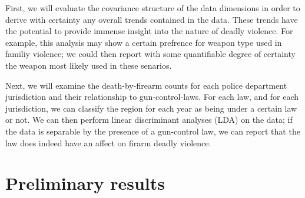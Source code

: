 
First, we will evaluate the covariance structure of the data dimensions in order to derive with certainty any overall trends contained in the data.  These trends have the potential to provide immense insight into the nature of deadly violence.  For example, this analysis may show a certain prefrence for weapon type used in familiy violence;  we could then report with some quantifiable degree of certainty the weapon most likely used in these senarios.

Next, we will examine the death-by-firearm counts for each police department jurisdiction and their relationship to gun-control-laws.  For each law, and for each jurisdiction, we can classify the region for each year as being under a certain law or not.  We can then perform linear discriminant analyses (LDA) on the data; if the data is separable by the presence of a gun-control law, we can report that the law does indeed have an affect on firarm deadly violence.


\section{Preliminary results}

